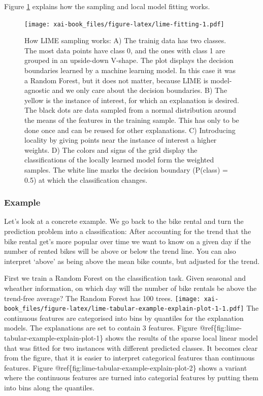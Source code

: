 \documentclass[12pt,]{krantz}
\theoremstyle{definition}
\theoremstyle{definition}
\theoremstyle{definition}
\theoremstyle{remark}
\begin{document}
Figure \ref{fig:lime-fitting} explains how the sampling and local model
fitting works.

\begin{figure}
\centering
\texttt{[image: xai-book\_files/figure-latex/lime-fitting-1.pdf]}
\caption{\label{fig:lime-fitting}How LIME sampling works: A) The trainig
data has two classes. The most data points have class 0, and the ones
with class 1 are grouped in an upside-down V-shape. The plot displays
the decision boundaries learned by a machine learning model. In this
case it was a Random Forest, but it does not matter, because LIME is
model-agnostic and we only care about the decision boundaries. B) The
yellow is the instance of interest, for which an explanation is desired.
The black dots are data sampled from a normal distribution around the
means of the features in the training sample. This has only to be done
once and can be reused for other explanations. C) Introducing locality
by giving points near the instance of interest a higher weights. D) The
colors and signs of the grid display the classifications of the locally
learned model form the weighted samples. The white line marks the
decision boundary (P(class) = 0.5) at which the classification changes.}
\end{figure}

\subsubsection{Example}\label{example-3}

Let's look at a concrete example. We go back to the bike rental and turn
the prediction problem into a classification: After accounting for the
trend that the bike rental get's more popular over time we want to know
on a given day if the number of rented bikes will be above or below the
trend line. You can also interpret `above' as being above the mean bike
counts, but adjusted for the trend.

First we train a Random Forest on the classification task. Given
seasonal and wheather information, on which day will the number of bike
rentals be above the trend-free average? The Random Forest has 100
trees.
\texttt{[image: xai-book\_files/figure-latex/lime-tabular-example-explain-plot-1-1.pdf]}
The continuous features are categorised into bins by quantiles for the
explanation models. The explanations are set to contain 3 features.
Figure @ref\{fig:lime-tabular-example-explain-plot-1\} shows the results
of the sparse local linear model that was fitted for two instances with
different predicted classes. It becomes clear from the figure, that it
is easier to interpret categorical features than continuous features.
Figure @ref\{fig:lime-tabular-example-explain-plot-2\} shows a variant
where the continuous features are turned into categorial features by
putting them into bins along the quantiles.
\end{document}

